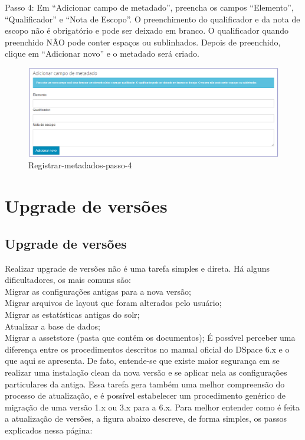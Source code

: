 \documentclass[12pt,hidelinks]{article}
\begin{document}
Passo 4: Em “Adicionar campo de metadado”, preencha os campos “Elemento”, “Qualificador” e “Nota de Escopo”. O preenchimento do qualificador e da nota de escopo não é obrigatório e pode ser deixado em branco. O qualificador quando preenchido NÃO pode conter espaços ou sublinhados. Depois de preenchido, clique em “Adicionar novo” e o metadado será criado.

        \begin{figure}[!htp]
                \centering
                \includegraphics[scale=0.5]{figura/registrar-metadados-passo4.png}
                \caption{Registrar-metadados-passo-4}
            \label{Rotulo}
        \end{figure}

\newpage


\section{Upgrade de versões}
\newpage
\subsection{Upgrade de versões}
Realizar upgrade de versões não é uma tarefa simples e direta. Há alguns dificultadores, os mais comuns são:\\

\textbullet \hspace{6pt} Migrar as configurações antigas para a nova versão;\\
\textbullet \hspace{6pt} Migrar arquivos de layout que foram alterados pelo usuário;\\
\textbullet \hspace{6pt} Migrar as estatísticas antigas do solr;\\
\textbullet \hspace{6pt} Atualizar a base de dados;\\
\textbullet \hspace{6pt} Migrar a assetstore (pasta que contém os documentos);
\singlespacing
É possível perceber uma diferença entre os procedimentos descritos no manual oficial do DSpace 6.x e o que aqui se apresenta. De fato, entende-se que existe maior segurança em se realizar uma instalação clean da nova versão e se aplicar nela as configurações particulares da antiga. Essa tarefa gera também uma melhor compreensão do processo de atualização, e é possível estabelecer um procedimento genérico de migração de uma versão 1.x ou 3.x para a 6.x.
\singlespacing
Para melhor entender como é feita a atualização de versões, a figura abaixo descreve, de forma simples, os passos explicados nessa página:
\end{document}
